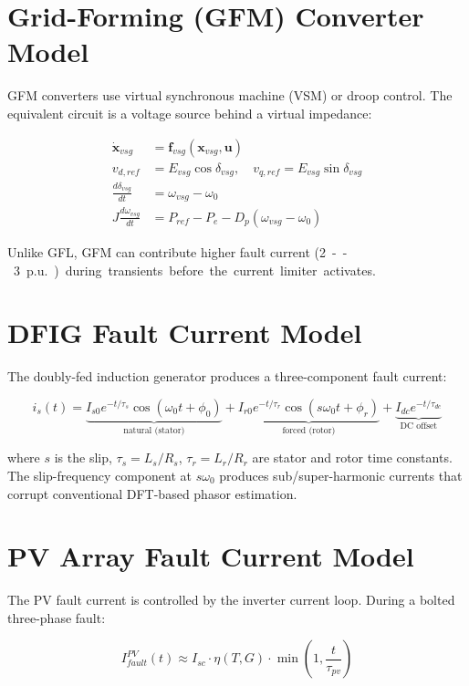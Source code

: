 \documentclass[11pt,a4paper]{report}
\newcommand{\pu}{p.u.}
\newcommand{\bvec}[1]{\mathbf{#1}}
\begin{document}
\section{Grid-Forming (GFM) Converter Model}

GFM converters use virtual synchronous machine (VSM) or droop control. The equivalent circuit is a voltage source behind a virtual impedance:

\begin{align}
\dot{\bvec{x}}_{vsg} &= \bvec{f}_{vsg}(\bvec{x}_{vsg},\bvec{u}) \label{eq:vsg}\\
v_{d,ref} &= E_{vsg}\cos\delta_{vsg},\quad v_{q,ref} = E_{vsg}\sin\delta_{vsg} \\
\frac{d\delta_{vsg}}{dt} &= \omega_{vsg} - \omega_0 \\
J\frac{d\omega_{vsg}}{dt} &= P_{ref} - P_e - D_p(\omega_{vsg}-\omega_0)
\end{align}

Unlike GFL, GFM can contribute higher fault current (\SI{2}--\SI{3}{\pu}) during transients before the current limiter activates.

\section{DFIG Fault Current Model}

The doubly-fed induction generator produces a three-component fault current:

\begin{equation}
\label{eq:dfig_fault}
i_s(t) = \underbrace{I_{s0}e^{-t/\tau_s}\cos(\omega_0 t + \phi_0)}_{\text{natural (stator)}}
         + \underbrace{I_{r0}e^{-t/\tau_r}\cos(s\omega_0 t + \phi_r)}_{\text{forced (rotor)}}
         + \underbrace{I_{dc}e^{-t/\tau_{dc}}}_{\text{DC offset}}
\end{equation}

where $s$ is the slip, $\tau_s = L_s/R_s$, $\tau_r = L_r/R_r$ are stator and rotor time constants. The slip-frequency component at $s\omega_0$ produces sub/super-harmonic currents that corrupt conventional DFT-based phasor estimation.

\section{PV Array Fault Current Model}

The PV fault current is controlled by the inverter current loop. During a bolted three-phase fault:

\begin{equation}
I_{fault}^{PV}(t) \approx I_{sc}\cdot\eta(T,G)\cdot \min\!\left(1,\frac{t}{\tau_{pv}}\right)
\end{equation}
\end{document}
